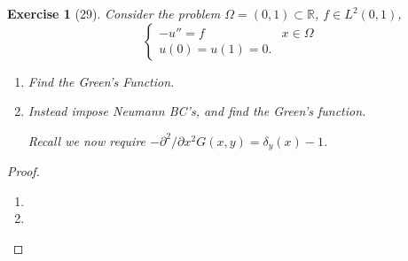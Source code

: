 \documentclass[letterpaper,twoside,11pt]{article}
\theoremstyle{mystyle}
\newtheorem*{exercise}{Exercise}
\newcommand{\R}{{\mathbb R}}
\newcommand{\cbk}{\color{black}}
\newcommand{\cblu}{\color{blue}}
\begin{document}
\cbk 











\newpage 
\begin{exercise}[29]
  Consider the problem 
  $\Omega= \left( 0,1 \right)\subset \R$, $f\in L^2 \left( 0,1 \right)$, 
  \[\left\{ {\begin{array}{*{20}{l}}
    -u'' = f & x \in \Omega \\[.2cm]
    u(0) = u(1) = 0.
  \end{array}} \right.\]
  \begin{enumerate}
    \item Find the Green's Function. 
    \item Instead impose Neumann BC's, and find the Green's function. 
    
    Recall we now require \(-\partial^2/\partial x^2 G(x, y) = \delta_y(x) -1\).
  \end{enumerate}
\end{exercise}

\cblu
\begin{proof}
  \begin{enumerate}
    \item  
    \item 
  \end{enumerate}
\end{proof}
\cbk 
\end{document}
